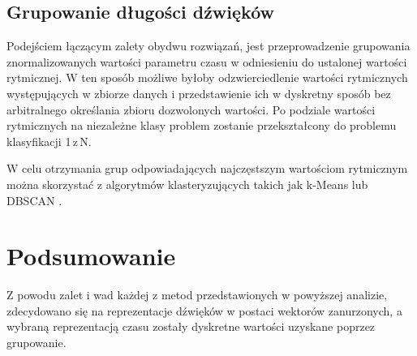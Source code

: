 {{        \subsection{Grupowanie długości dźwięków}
        {
            Podejściem łączącym zalety obydwu rozwiązań, jest przeprowadzenie grupowania znormalizowanych wartości parametru czasu w
            odniesieniu do ustalonej wartości rytmicznej. W\,\,ten sposób możliwe byłoby odzwierciedlenie wartości rytmicznych
            występujących w\,\,zbiorze danych i\,\,przedstawienie ich w\,\,dyskretny sposób bez arbitralnego określania zbioru dozwolonych
            wartości. 
            Po podziale wartości rytmicznych na niezależne klasy problem zostanie przekształcony do problemu klasyfikacji 1\,z\,N. 

            W celu otrzymania grup odpowiadających najczęstszym wartościom rytmicznym można skorzystać 
            z\,\,algorytmów klasteryzujących takich jak k-Means \cite{MacQueen1967SomeMF} lub DBSCAN \cite{Ester1996ADA}.
        }
    }

    \section{Podsumowanie}
    {
        Z\,\,powodu zalet i\,\,wad każdej z\,\,metod przedstawionych w\,\,powyższej analizie, zdecydowano się na reprezentacje dźwięków w\,\,postaci
        wektorów zanurzonych, a\,\,wybraną reprezentacją czasu zostały dyskretne wartości uzyskane poprzez grupowanie.
    }
}